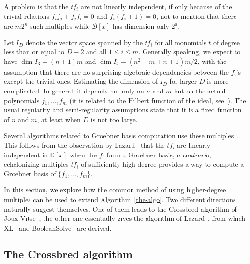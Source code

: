 \documentclass[a4paper,UKenglish,cleveref, autoref]{lipics-v2019}
\newcommand{\red}{\color{red}}
\newcommand{\TODO}[1]{{\red \textbf{TODO}:} #1\xspace}
\begin{document}
A problem is that the $t f_i$ are not linearly independent, if only because of
the trivial relations $f_i f_j + f_j f_i = 0$ and $f_i (f_i + 1) = 0$, not to
mention that there are $m 2^n$ such multiples while $\mathcal{B}[x]$ has
dimension only $2^n$.

Let $I_D$ denote the vector space spanned by the $t f_i$ for all monomials $t$
of degree less than or equal to $D-2$ and all $1 \leq i \leq m$. Generally
speaking, we expect to have $\dim I_3 = (n+1) m$ and
$\dim I_4 = (n^2 - m + n + 1)m/2 $, with the assumption that there are no
surprising algebraic dependencies between the $f_i$'s except the trivial
ones. Estimating the dimension of $I_D$ for larger $D$ is more complicated. In
general, it depends not only on $n$ and $m$ but on the actual polynomials
$f_1, \dots, f_m$ (it is related to the Hilbert function of the ideal,
see~\cite{Ideals_varieties_algos}). The usual regularity and semi-regularity
assumptions state that it is a fixed function of $n$ and $m$, at least when $D$
is not too large. 
%


Several algorithms related to Groebner basis computation use these
multiples~\cite{F4,F5,CourtoisKPS00,BardetFSS13,JouxV17}. This follows from the
observation by Lazard~\cite{Lazard83} that the $t f_i$ are linearly independent
in $\mathbb{K}[x]$ when the $f_i$ form a Groebner basis; \textit{a contrario},
echelonizing multiples $t f_i$ of sufficiently high degree provides a way to
compute a Groebner basis of $\{f_1, \dots, f_m\}$.

In this section, we explore how the common method of using higher-degree
multiples can be used to extend Algorithm~\ref{the-algo}. Two different
directions naturally suggest themselves. One of them leads to the
\textsf{Crossbred} algorithm of Joux-Vitse~\cite{JouxV17}, the other one
essentially gives the algorithm of Lazard~\cite{Lazard83}, from which
\textsf{XL}~\cite{CourtoisKPS00} and \textsf{BooleanSolve}~\cite{BardetFSS13}
are derived.


\subsection{The \textsf{Crossbred} algorithm}
\label{sec:JV}
\end{document}
